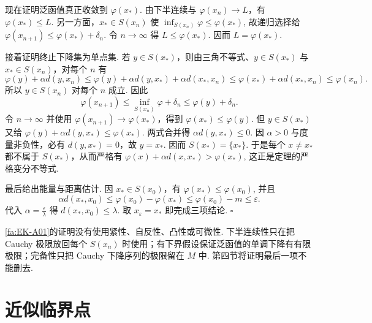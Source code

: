 \begin{FAProof}
现在证明泛函值真正收敛到 \(\displaystyle\varphi(x_*)\). 由下半连续与 \(\displaystyle\varphi(x_n)\to L\)，有 \(\displaystyle\varphi(x_*)\leqslant L\). 另一方面，\(\displaystyle x_*\in S(x_n)\) 使
\(\displaystyle \inf_{S(x_n)}\varphi \leqslant \varphi(x_*)\),
故递归选择给
\(\displaystyle \varphi(x_{n+1}) \leqslant \varphi(x_*)+\delta_n\).
令 \(\displaystyle n\to\infty\) 得 \(\displaystyle L\leqslant\varphi(x_*)\). 因而
\(\displaystyle L=\varphi(x_*)\).

接着证明终止下降集为单点集. 若 \(\displaystyle y\in S(x_*)\)，则由三角不等式、\(\displaystyle y\in S(x_*)\) 与 \(\displaystyle x_*\in S(x_n)\)，对每个 \(\displaystyle n\) 有
\[
\varphi(y)+\alpha d(y,x_n)
\leqslant
\varphi(y)+\alpha d(y,x_*)+\alpha d(x_*,x_n)
\leqslant
\varphi(x_*)+\alpha d(x_*,x_n)
\leqslant
\varphi(x_n).
\]
所以 \(\displaystyle y\in S(x_n)\) 对每个 \(\displaystyle n\) 成立. 因此
\[
\varphi(x_{n+1})
\leqslant
\inf_{S(x_n)}\varphi+\delta_n
\leqslant
\varphi(y)+\delta_n.
\]
令 \(\displaystyle n\to\infty\) 并使用 \(\displaystyle\varphi(x_{n+1})\to\varphi(x_*)\)，得到 \(\displaystyle\varphi(x_*)\leqslant\varphi(y)\). 但 \(\displaystyle y\in S(x_*)\) 又给
\(\displaystyle \varphi(y)+\alpha d(y,x_*) \leqslant \varphi(x_*)\).
两式合并得 \(\displaystyle\alpha d(y,x_*)\leqslant0\). 因 \(\displaystyle\alpha>0\) 与度量非负性，必有 \(\displaystyle d(y,x_*)=0\)，故 \(\displaystyle y=x_*\). 因而
\(\displaystyle S(x_*)=\{x_*\}\).
于是每个 \(\displaystyle x\neq x_*\) 都不属于 \(\displaystyle S(x_*)\)，从而严格有
\(\displaystyle \varphi(x)+\alpha d(x,x_*) > \varphi(x_*)\),
这正是定理的严格变分不等式.

最后给出能量与距离估计. 因 \(\displaystyle x_*\in S(x_0)\)，有
\(\displaystyle \varphi(x_*) \leqslant \varphi(x_0)\),
并且
\[
\alpha d(x_*,x_0)
\leqslant
\varphi(x_0)-\varphi(x_*)
\leqslant
\varphi(x_0)-m
\leqslant
\varepsilon.
\]
代入 \(\displaystyle\alpha=\frac{\varepsilon}{\lambda}\) 得 \(\displaystyle d(x_*,x_0)\leqslant\lambda\). 取 \(\displaystyle x_\varepsilon=x_*\) 即完成三项结论.
\hfill\(\square\)
\end{FAProof}

\begin{FARemark}[假设的精确边界]
\autoref{fa:EK-A01}的证明没有使用紧性、自反性、凸性或可微性. 下半连续性只在把 Cauchy 极限放回每个 \(\displaystyle S(x_n)\) 时使用；有下界假设保证泛函值的单调下降有有限极限；完备性只把 Cauchy 下降序列的极限留在 \(\displaystyle M\) 中. 第四节将证明最后一项不能删去.
\end{FARemark}

\section{近似临界点}\label{sec:iii08-critical}

